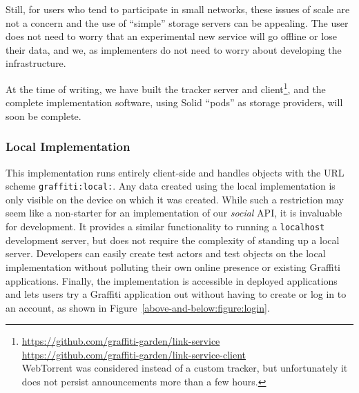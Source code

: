 Still, for users who tend to participate in small networks, these issues
of scale are not a concern and the use of ``simple'' storage servers can be appealing.
The user does not need to worry that an experimental new service
will go offline or lose their data, and we, as implementers do not need to
worry about developing the infrastructure.

At the time of writing, we have built the tracker server and client\footnote{
  \url{https://github.com/graffiti-garden/link-service}\\
  \url{https://github.com/graffiti-garden/link-service-client}\\
  WebTorrent was considered instead of a custom tracker,
  but unfortunately it does not persist announcements more than a few hours.
}, and the complete implementation software,
using Solid ``pods'' as storage providers,
will soon be complete.


\subsubsection{Local Implementation}

This implementation runs entirely client-side
and handles objects with the URL scheme \texttt{graffiti:local:}.
Any data created using the local implementation is only visible on the device on which
it was created.
While such a restriction may seem like a non-starter for an implementation
of our \emph{social} API, it is invaluable for development.
It provides a similar functionality to running a \texttt{localhost} development server,
but
does not require the complexity of standing up a local server.
Developers can easily create test actors and test objects on the local implementation
without polluting their own online presence or existing Graffiti applications.
Finally, the implementation is accessible in deployed applications
and lets users try a Graffiti application out without
having to create or log in to an account, as shown in
Figure~\ref{above-and-below:figure:login}.

